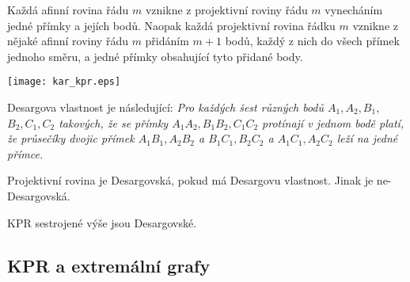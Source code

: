 \begin{consequence}
    Každá afinní rovina řádu $m$ vznikne z projektivní roviny řádu $m$ vynecháním jedné přímky a jejích bodů.
    Naopak každá projektivní rovina řádku $m$ vznikne z nějaké afinní roviny řádu $m$ přidáním $m+1$ bodů, každý z nich do všech přímek jednoho směru, a jedné přímky obsahující tyto přidané body.

	\texttt{[image: kar\_kpr.eps]}
\end{consequence}
\begin{definition}
    Desargova vlastnost je následující: \emph{Pro každých šest různých bodů $A_1, A_2, B_1,$ $B_2, C_1, C_2$ takových, že se přímky $A_1A_2, B_1B_2, C_1C_2$ protínají v jednom bodě platí, že průsečíky dvojic přímek $A_1B_1, A_2B_2$ a $B_1C_1, B_2C_2$ a $A_1C_1, A_2C_2$ leží na jedné přímce.}
\end{definition}
\begin{definition}
    Projektivní rovina je Desargovská, pokud má Desargovu vlastnost. Jinak je ne-Desargovská.
\end{definition}
\begin{exercise}
    KPR sestrojené výše jsou Desargovské.
\end{exercise}

\subsection{KPR a extremální grafy}

\begin{example}
\end{example}

\begin{example}
\end{example}
